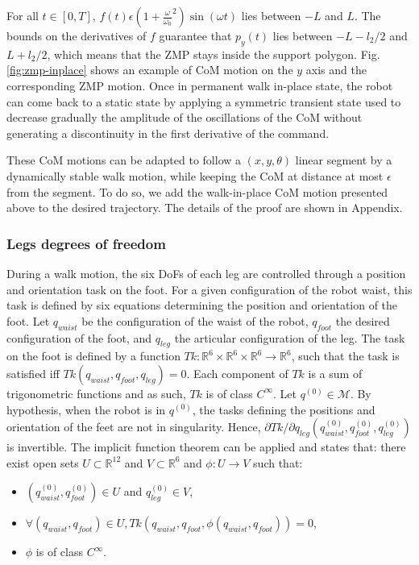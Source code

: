 \documentclass{article}
\begin{document}
For    all     $t    \in    [0,T]$,    $f(t)     \epsilon    (1    +
\frac{\omega}{\omega_0}^2)  \sin  (\omega t)$  lies  between $-L$  and
$L$. The bounds on the derivatives of $f$ guarantee that $p_y(t)$ lies
between  $-L- l_2/2$ and  $L+ l_2/2$,  which means  that the  ZMP stays
inside  the  support  polygon.  Fig.  \ref{fig:zmp-inplace}  shows  an
example  of CoM  motion  on the  $y$  axis and  the corresponding  ZMP
motion. Once in permanent walk in-place state, the robot can come back
to  a static  state by  applying a  symmetric transient  state  used to
decrease  gradually  the amplitude  of  the  oscillations  of the  CoM
without  generating a  discontinuity in  the first  derivative  of the
command.


These CoM motions can be adapted to follow a $(x,y,\theta)$ linear
segment by a dynamically stable walk motion, while keeping the CoM at
distance at most $\epsilon$ from the segment. To do so, we add the
walk-in-place CoM motion presented above to the desired
trajectory.  The details of the proof are shown in Appendix.





\subsubsection{Legs degrees of freedom}

During a walk motion, the six  DoFs of each leg are controlled through
a position and orientation task on the foot. For a given configuration
of  the  robot  waist,  this   task  is  defined  by  six  equations
determining the position and  orientation of the foot. Let $q_{waist}$
be the configuration of the waist of the robot, $q_{foot}$ the desired
configuration of  the foot, and $q_{leg}$  the articular configuration
of  the leg.  The  task  on the  foot  is defined  by  a function  $Tk:
\mathbb{R}^6  \times   \mathbb{R}^6  \times  \mathbb{R}^6  \rightarrow
\mathbb{R}^6$,  such  that the  task  is  satisfied iff  $Tk(q_{waist},
q_{foot},  q_{leg})  =  0$.  Each   component  of  $Tk$  is  a  sum  of
trigonometric functions and  as such, $Tk$ is of  class $C^\infty$. Let
$q^{(0)}  \in  \mathcal{M}$.  By  hypothesis,  when the  robot  is  in
$q^{(0)}$,  the tasks defining  the positions  and orientation  of the
feet are  not in  singularity. Hence, $\partial  Tk /  \partial q_{leg}
(q_{waist}^{(0)},  q_{foot}^{(0)}, q_{leg}^{(0)})$ is  invertible. The
implicit  function theorem  can be  applied and  states  that: there
exist   open  sets   $U  \subset   \mathbb{R}^{12}$  and   $V  \subset
\mathbb{R}^6$ and $\phi : U \rightarrow V$ such that:
\begin{itemize}
\item  $(q_{waist}^{(0)}, q_{foot}^{(0)}) \in U$ and $
  q_{leg}^{(0)} \in V$,
\item $\forall (q_{waist}, q_{foot}) \in U, Tk(q_{waist}, q_{foot},\phi(q_{waist}, q_{foot})) =0$,
\item $\phi$ is of class $C^\infty$.
\end{itemize}
\end{document}
